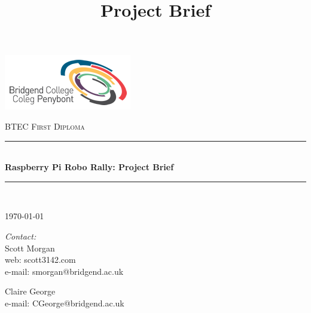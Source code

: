 \documentclass[10pt]{article}
\title{Project Brief}
\begin{document}
	\begin{center}																		%
		\newcommand{\HRule}{\rule{\linewidth}{0.5mm}}									%
			\begin{flushright}
				\includegraphics[scale = 1]{bcoll.png}
		\end{flushright}
		
		\vspace*{3cm}								%
		\textsc{\huge BTEC First Diploma}\\[1.5cm]
		
		\vspace{3cm}											%
		\HRule \\[0.4cm]																	%
		{ \huge \bfseries Raspberry Pi Robo Rally: Project Brief}\\[0.4cm]	%
		\HRule \\[1.5cm]																	%
		
		\vspace{2cm} 																				
		\begin{center}																					
			{\large \today}																	%
		\end{center}												  						
	\end{center}	
	\vspace*{3cm}																			
	
	\begin{minipage}{0.52\textwidth}													%
		\begin{flushleft} \large															%
			\emph{Contact: %
			}\\	
			Scott Morgan\\
			web: scott3142.com\\
			e-mail: smorgan@bridgend.ac.uk\\
		\end{flushleft}																		%
	\end{minipage}
	\begin{minipage}{0.46\textwidth}	
		\begin{flushright} \large															%
			Claire George\\
			e-mail: CGeorge@bridgend.ac.uk\\
		\end{flushright}																		%
	\end{minipage}
	
\end{document}

